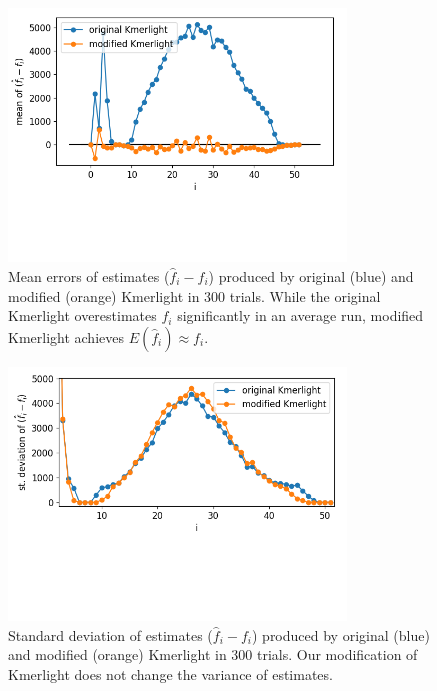 \begin{figure}[h!]
\centerline{\includegraphics[width=0.8\textwidth, trim={0cm, 3.5cm, 0cm, 0cm}, clip]{images/means_comparison.png}}
\caption[Mean error of the original Kmerlight and the modified Kmerlight]{Mean errors of estimates
($\hat f_i - f_i$) produced by original (blue) and modified (orange) Kmerlight in 300 trials. 
While the original Kmerlight overestimates $f_i$ significantly in an average run,
modified Kmerlight achieves $E(\hat f_i) \approx f_i$.}
\label{img:mean-new-algorithm}
\end{figure}

\begin{figure}[h!]
\centerline{\includegraphics[width=0.8\textwidth, trim={0cm, 4.3cm, 0cm, 0cm}, clip]{images/std_deviations_comparison.png}}
\caption[Variance of the original Kmerlight and the modified Kmerlight]{Standard deviation
of estimates ($\hat f_i - f_i$) produced by original (blue) and modified (orange) Kmerlight 
in 300 trials. Our modification of Kmerlight does not change the variance of estimates.}
\label{img:std-new-algorithm}
\end{figure}
